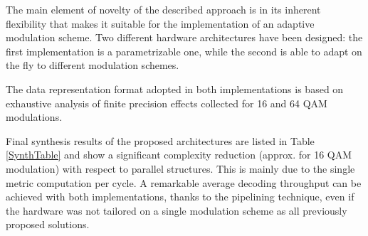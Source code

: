 \documentclass[12pt,onecolumn,draftclsnofoot]{IEEEtran}
\begin{document}
The main element of novelty of the described approach is in its 
inherent flexibility that makes it suitable for the implementation of
an adaptive modulation scheme.
Two different hardware architectures have been designed: the first 
implementation is a parametrizable one,
while the second is able to adapt on the fly to different modulation
schemes.

The data representation format adopted in both implementations is
based on exhaustive analysis of finite precision effects
collected for 16 and 64 QAM modulations.

Final synthesis results of the proposed architectures are listed in
Table \ref{SynthTable} and show a significant complexity reduction
(approx.  for 16 QAM modulation) with respect to parallel
structures. This is mainly due to the single metric computation per
cycle. A remarkable average decoding throughput can be achieved with
both implementations, thanks to the pipelining technique, even if
the hardware was not tailored on a single modulation scheme as all
previously proposed solutions.


\end{document}
